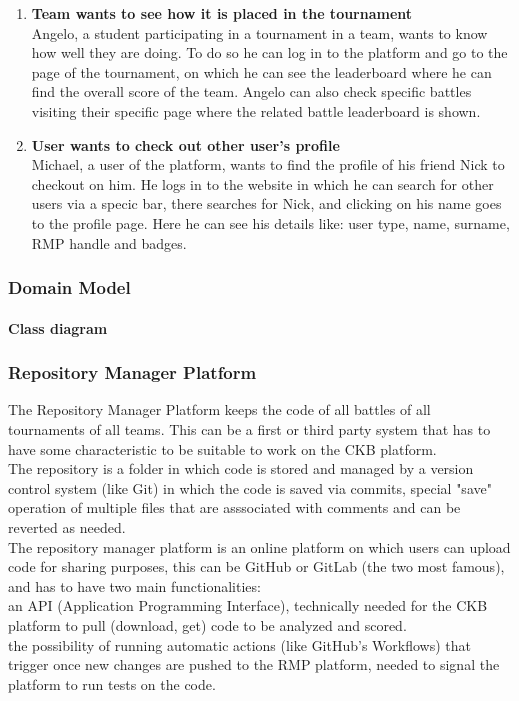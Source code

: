 \begin{enumerate}[label=$\bullet$ \textbf{SC\arabic*:}]
    \item \textbf{Team wants to see how it is placed in the tournament}\\ Angelo, a student participating in a tournament in a team, wants to know how well they are doing. To do so he can log in to the platform and go to the page of the tournament, on which he can see the leaderboard where he can find the overall score of the team. Angelo can also check specific battles visiting their specific page where the related battle leaderboard is shown.
    \item \textbf{User wants to check out other user's profile}\\ Michael, a user of the platform, wants to find the profile of his friend Nick to checkout on him. He logs in to the website in which he can search for other users via a specic bar, there searches for Nick, and clicking on his name goes to the profile page. Here he can see his details like: user type, name, surname, RMP handle and badges.
\end{enumerate}
\subsubsection{Domain Model}
\paragraph{Class diagram}

\subsubsection{Repository Manager Platform}
The Repository Manager Platform keeps the code of all battles of all tournaments of all teams. This can be a first or third party system that has to have some characteristic to be suitable to work on the CKB platform.\\
The repository is a folder in which code is stored and managed by a version control system (like Git) in which the code is saved via commits, special "save" operation of multiple files that are asssociated with comments and can be reverted as needed.\\
The repository manager platform is an online platform on which users can upload code for sharing purposes, this can be GitHub or GitLab (the two most famous), and has to have two main functionalities:\\
    an API (Application Programming Interface), technically needed for the CKB platform to pull (download, get) code to be analyzed and scored.\\
    the possibility of running automatic actions (like GitHub's Workflows) that trigger once new changes are pushed to the RMP platform, needed to signal the platform to run tests on the code.
